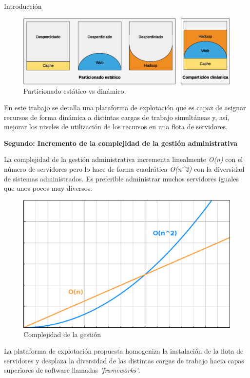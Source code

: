 \documentclass[a4paper,12pt,spanish,final]{epsc_tfc_pfc}
\begin{document}
\begin{intro}{Introducción}
\begin{figure}[h]
  \centering
  \includegraphics[scale=0.55]{static}
    \caption{Particionado estático vs dinámico.}
\end{figure}

En este trabajo se detalla una plataforma de explotación que es capaz de asignar recursos de forma dinámica a distintas cargas de trabajo simultáneas y, así, mejorar los niveles de utilización de los recursos en una flota de servidores.

\textbf{Segundo: Incremento de la complejidad de la gestión administrativa}

La complejidad de la gestión administrativa incrementa linealmente \emph{O(n)} con el número de servidores pero lo hace de forma cuadrática \emph{O(n\^{}2)} con la diversidad de sistemas administrados. Es preferible administrar muchos servidores iguales que unos pocos muy diversos.

\begin{figure}[h]
  \centering
    \includegraphics[scale=0.25]{complex}
      \caption{Complejidad de la gestión}
\end{figure}

La plataforma de explotación propuesta homogeniza la instalación de la flota de servidores y desplaza la diversidad de las distintas cargas de trabajo hacia capas superiores de software llamadas \emph{'frameworks'}.


\end{intro}
\end{document}
